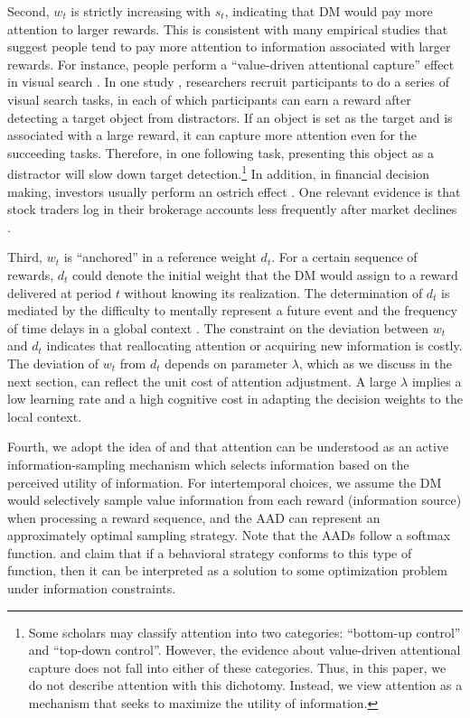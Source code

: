 \documentclass[
  12pt,
]{article}
\begin{document}
Second, \(w_t\) is strictly increasing with \(s_t\), indicating that DM
would pay more attention to larger rewards. This is consistent with many
empirical studies that suggest people tend to pay more attention to
information associated with larger rewards. For instance, people perform
a ``value-driven attentional capture'' effect in visual search
\citep{della2009learning, hickey2010reward, anderson2011value, chelazzi2013rewards, jahfari2017sensitivity}.
In one study \citep{anderson2011value}, researchers recruit participants
to do a series of visual search tasks, in each of which participants can
earn a reward after detecting a target object from distractors. If an
object is set as the target and is associated with a large reward, it
can capture more attention even for the succeeding tasks. Therefore, in
one following task, presenting this object as a distractor will slow
down target detection.\footnote{Some scholars may classify attention
  into two categories: ``bottom-up control'' and ``top-down control''.
  However, the evidence about value-driven attentional capture does not
  fall into either of these categories. Thus, in this paper, we do not
  describe attention with this dichotomy. Instead, we view attention as
  a mechanism that seeks to maximize the utility of information.} In
addition, in financial decision making, investors usually perform an
ostrich effect \citep{galai2006ostrich, karlsson2009ostrich}. One
relevant evidence is that stock traders log in their brokerage accounts
less frequently after market declines \citep{sicherman2016financial}.

Third, \(w_t\) is ``anchored'' in a reference weight \(d_t\). For a
certain sequence of rewards, \(d_t\) could denote the initial weight
that the DM would assign to a reward delivered at period \(t\) without
knowing its realization. The determination of \(d_t\) is mediated by the
difficulty to mentally represent a future event
\citep{trope2003temporal} and the frequency of time delays in a global
context \citep{stewart2006decision}. The constraint on the deviation
between \(w_t\) and \(d_t\) indicates that reallocating attention or
acquiring new information is costly. The deviation of \(w_t\) from
\(d_t\) depends on parameter \(\lambda\), which as we discuss in the
next section, can reflect the unit cost of attention adjustment. A large
\(\lambda\) implies a low learning rate and a high cognitive cost in
adapting the decision weights to the local context.

Fourth, we adopt the idea of \citet{gottlieb2012attention} and
\citet{gottlieb2013information} that attention can be understood as an
active information-sampling mechanism which selects information based on
the perceived utility of information. For intertemporal choices, we
assume the DM would selectively sample value information from each
reward (information source) when processing a reward sequence, and the
AAD can represent an approximately optimal sampling strategy. Note that
the AADs follow a softmax function. \citet{matvejka2015rational} and
\citet{mackowiak2023rational} claim that if a behavioral strategy
conforms to this type of function, then it can be interpreted as a
solution to some optimization problem under information constraints.
\end{document}
